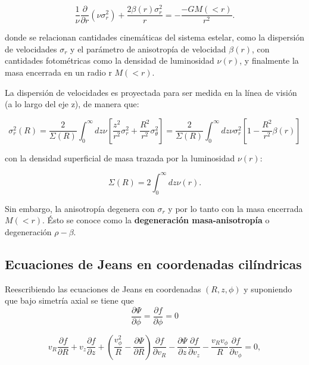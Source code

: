 \begin{equation}
\frac{1}{\nu} \frac{\partial }{\partial r} (\nu \sigma_r^2) + \frac{2\beta(r)\sigma_r^2}{r} = -\frac{-GM (<r)}{r^2}.
\end{equation}

donde se relacionan cantidades cinemáticas del sistema estelar, como la dispersión de velocidades $\sigma_r$ y el parámetro de anisotropía de velocidad $\beta(r)$, con cantidades fotométricas como la densidad de luminosidad $\nu(r)$, y finalmente la masa encerrada en un radio r $M (<r)$. 

La dispersión de velocidades es proyectada para ser medida en la línea de visión (a lo largo del eje z), de manera que:

\begin{equation}
\sigma_r^2(R) = \frac{2}{\Sigma (R)} \int_0^{\infty} dz \nu \left [ \frac{z^2}{r^2}\sigma_r^2 + \frac{R^2}{r^2} \sigma_{\theta}^2 \right ] = \frac{2}{\Sigma (R)} \int_0^{\infty} dz \nu \sigma_r^2  \left [ 1- \frac{R^2}{r^2} \beta (r) \right ]
\end{equation}

con la densidad superficial de masa trazada por la luminosidad $\nu(r)$:

\begin{equation}
\Sigma (R) = 2 \int_0^{\infty} dz \nu (r).
\end{equation}

Sin embargo, la anisotropía degenera con $\sigma_r$ y por  lo tanto con la masa encerrada $M(<r)$. Ésto se conoce como la \textbf{degeneración masa-anisotropía} o degeneración $\rho - \beta$.


\subsection{Ecuaciones de Jeans en coordenadas cilíndricas }

Reescribiendo las ecuaciones de Jeans en coordenadas $(R, z, \phi)$ y suponiendo que bajo simetría axial se tiene que 
$$ \frac{\partial \Psi}{\partial \phi} =  \frac{\partial f }{\partial \phi} = 0 $$

\begin{equation}
\label{Boltzmann_cylindric}
v_R \frac{\partial f}{\partial R} +  v_z \frac{\partial f}{\partial z} + \left ( \frac{v_{\phi}^2}{R} - \frac{\partial \Psi}{\partial R}  \right ) \frac{\partial f}{\partial v_R} - \frac{\partial \Psi}{\partial z} \frac{\partial f}{\partial v_z} - \frac{v_R v_{\phi} }{ R} \frac{\partial f}{\partial v_{\phi}} = 0,  
\end{equation}

